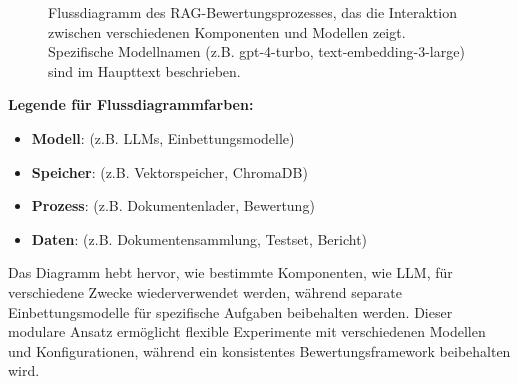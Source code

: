 \begin{figure}[htbp]
{
    }
    \caption{Flussdiagramm des RAG-Bewertungsprozesses, das die Interaktion zwischen verschiedenen Komponenten und Modellen zeigt. Spezifische Modellnamen (z.B. gpt-4-turbo, text-embedding-3-large) sind im Haupttext beschrieben.}
    \label{fig:rag-flow}
\end{figure}

\begin{center}
\begin{minipage}{0.85\textwidth}
\textbf{Legende für Flussdiagrammfarben:}
\begin{itemize}
    \item \colorbox{pink!20}{\strut\hspace{1.5em}} \textbf{Modell}: (z.B. LLMs, Einbettungsmodelle)
    \item \colorbox{blue!20}{\strut\hspace{1.5em}} \textbf{Speicher}: (z.B. Vektorspeicher, ChromaDB)
    \item \colorbox{green!20}{\strut\hspace{1.5em}} \textbf{Prozess}: (z.B. Dokumentenlader, Bewertung)
    \item \colorbox{red!20}{\strut\hspace{1.5em}} \textbf{Daten}: (z.B. Dokumentensammlung, Testset, Bericht)
\end{itemize}
\end{minipage}
\end{center}

Das Diagramm hebt hervor, wie bestimmte Komponenten, wie LLM, für verschiedene Zwecke wiederverwendet werden, während separate Einbettungsmodelle für spezifische Aufgaben beibehalten werden. Dieser modulare Ansatz ermöglicht flexible Experimente mit verschiedenen Modellen und Konfigurationen, während ein konsistentes Bewertungsframework beibehalten wird. 